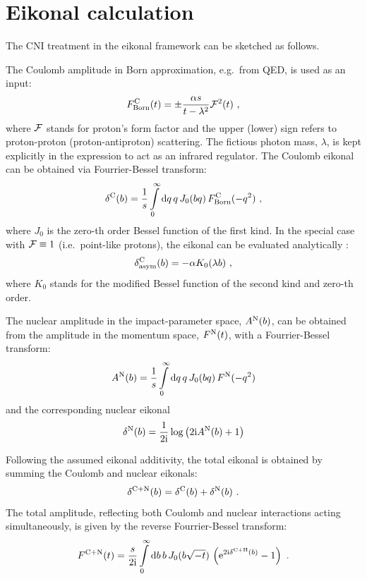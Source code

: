 \documentclass[pdftex,twocolumn,epjc3]{svjour3}
\def\d{{\rm d}}
\def\e{{\rm e}}
\def\I{{\rm i}}
\begin{document}

\section{Eikonal calculation}
\label{sec:eikonal}

The CNI treatment in the eikonal framework can be sketched as follows.

The Coulomb amplitude in Born approximation, e.g.~from QED, is used as an input:
\begin{equation}
F^{\rm C}_{\rm Born}(t) = \pm {\alpha s\over t - \lambda^2} {\cal F}^2(t)\ ,
\label{eq:F C Born}
\end{equation}
where ${\cal F}$ stands for proton's form factor and the upper (lower) sign refers to proton-proton (proton-antiproton) scattering. The fictious photon mass, $\lambda$, is kept explicitly in the expression to act as an infrared regulator. The Coulomb eikonal can be obtained via Fourrier-Bessel transform:
\begin{equation}
\delta^{\rm C}(b) = {1\over s} \int\limits_0^\infty \d q\, q\, J_0(bq)\, F^{\rm C}_{\rm Born}(-q^2)\ ,
\label{eq:de C}
\end{equation}
where $J_0$ is the zero-th order Bessel function of the first kind. In the special case with ${\cal F} \equiv 1$ (i.e.~point-like protons), the eikonal can be evaluated analytically \cite{cahn82}:
\begin{equation}
\delta^{\rm C}_{\rm asym}(b) = -\alpha K_0(\lambda b)\ ,
\label{eq:de C asym}
\end{equation}
where $K_0$ stands for the modified Bessel function of the second kind and zero-th order.

The nuclear amplitude in the impact-parameter space, $A^{\rm N}(b)$, can be obtained from the amplitude in the momentum space, $F^{\rm N}(t)$, with a Fourrier-Bessel transform:
\begin{equation}
A^{\rm N}(b) = {1\over s} \int\limits_0^\infty \d q\, q\, J_0(bq)\, F^{\rm N}(-q^2)
\label{eq:A N}
\end{equation}
and the corresponding nuclear eikonal
\begin{equation}
\delta^{\rm N}(b) = {1\over 2\I} \log\left( 2\I A^{\rm N}(b) + 1\right)
\label{eq:de N}
\end{equation}

Following the assumed eikonal additivity, the total eikonal is obtained by summing the Coulomb and nuclear eikonals:
\begin{equation}
\delta^{\rm C+N}(b) = \delta^{\rm C}(b) + \delta^{\rm N}(b)\ .
\label{eq:de CN}
\end{equation}
The total amplitude, reflecting both Coulomb and nuclear interactions acting simultaneously, is given by the reverse Fourrier-Bessel transform:
\begin{equation}
F^{\rm C+N}(t) = {s\over 2\I} \int
\limits
_0^\infty 
\d b\, b\,J_0(b\sqrt{-t})\,\left( \e^{2\I \delta^{\rm C+H}(b)} - 1 \right)\ .
\label{eq:F CN}
\end{equation}
\end{document}

